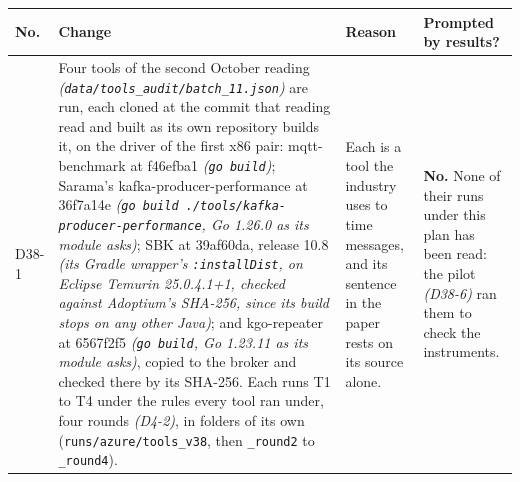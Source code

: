 \documentclass[11pt]{article}
\newcommand{\gl}[1]{{\color{soft}\itshape\small (#1)}}
\begin{document}
{\small
\begin{longtable}{@{}p{1.1cm} >{\raggedright\arraybackslash}p{6.1cm} >{\raggedright\arraybackslash}p{6.0cm} >{\raggedright\arraybackslash}p{2.2cm}@{}}
\toprule
\textbf{No.} & \textbf{Change} & \textbf{Reason} & \textbf{Prompted by results?} \\
\midrule
\endhead
D38-1 & Four tools of the second October reading \gl{\texttt{data/tools\_audit/batch\_11.json}} are run, each cloned at the commit that reading read and built as its own repository builds it, on the driver of the first x86 pair: mqtt-benchmark at f46efba1 \gl{\texttt{go build}}; Sarama's kafka-producer-performance at 36f7a14e \gl{\texttt{go build ./tools/kafka-producer-performance}, Go 1.26.0 as its module asks}; SBK at 39af60da, release 10.8 \gl{its Gradle wrapper's \texttt{:installDist}, on Eclipse Temurin 25.0.4.1+1, checked against Adoptium's SHA-256, since its build stops on any other Java}; and kgo-repeater at 6567f2f5 \gl{\texttt{go build}, Go 1.23.11 as its module asks}, copied to the broker and checked there by its SHA-256. Each runs T1 to T4 under the rules every tool ran under, four rounds \gl{D4-2}, in folders of its own (\texttt{runs/azure/tools\_v38}, then \texttt{\_round2} to \texttt{\_round4}). & Each is a tool the industry uses to time messages, and its sentence in the paper rests on its source alone. & \textbf{No.} None of their runs under this plan has been read: the pilot \gl{D38-6} ran them to check the instruments. \\

\end{longtable}}
\end{document}
